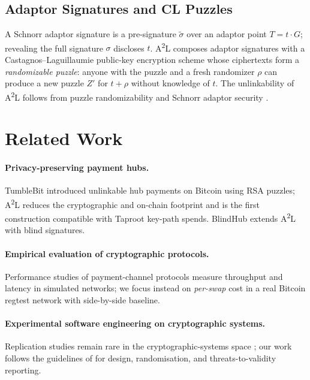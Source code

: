 \documentclass[sigconf,nonacm]{acmart}
\newcommand{\atwol}{A\textsuperscript{2}L\xspace}
\begin{document}
\subsection{Adaptor Signatures and CL Puzzles}
A Schnorr adaptor signature is a pre-signature $\tilde{\sigma}$ over an
adaptor point $T = t \cdot G$; revealing the full signature $\sigma$
discloses $t$. \atwol composes adaptor signatures with a Castagnos--Laguillaumie
public-key encryption scheme whose ciphertexts form a \emph{randomizable
	puzzle}: anyone with the puzzle and a fresh randomizer $\rho$ can produce a
new puzzle $Z'$ for $t + \rho$ without knowledge of $t$. The unlinkability
of \atwol follows from puzzle randomizability and Schnorr adaptor security
\citep{tairi2021a2l, aumayr2021generalized}.

\section{Related Work}
\label{sec:related}

\paragraph*{Privacy-preserving payment hubs.} TumbleBit \citep{heilman2017tumblebit}
introduced unlinkable hub payments on Bitcoin using RSA puzzles; \atwol
\citep{tairi2021a2l} reduces the cryptographic and on-chain footprint and is
the first construction compatible with Taproot key-path spends. BlindHub
\citep{qin2023blindhub} extends \atwol with blind signatures.

\paragraph*{Empirical evaluation of cryptographic protocols.}
Performance studies of payment-channel protocols
\citep{harris2020flare,roos2018settling} measure throughput and latency in
simulated networks; we focus instead on \emph{per-swap} cost in a real
Bitcoin regtest network with side-by-side baseline.

\paragraph*{Experimental software engineering on cryptographic systems.}
Replication studies remain rare in the cryptographic-systems space
\citep{wohlin2014guidelines,carver2010replications}; our work follows the
guidelines of \citet{wohlin2012experimentation} for design, randomisation,
and threats-to-validity reporting.
\end{document}
